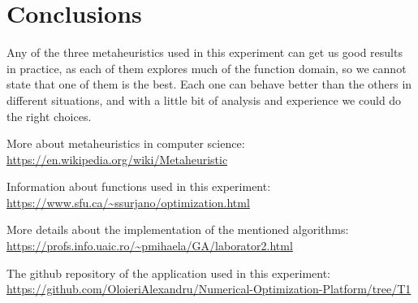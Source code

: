 \documentclass[a4paper]{article}
\begin{document}
\section{Conclusions}

Any of the three metaheuristics used in this experiment can get us good results in practice, as each of them explores much of the function domain, so we cannot state that one of them is the best. Each one can behave better than the others in different situations, and with a little bit of analysis and experience we could do the right choices.

\begin{thebibliography}{9}
	
	More about metaheuristics in computer science:
	\url{https://en.wikipedia.org/wiki/Metaheuristic}
	
	Information about functions used in this experiment:
	\url{https://www.sfu.ca/~ssurjano/optimization.html}
	
	More details about the implementation of the mentioned algorithms:
	\url{https://profs.info.uaic.ro/~pmihaela/GA/laborator2.html}
	
	The github repository of the application used in this experiment:
	\url{https://github.com/OloieriAlexandru/Numerical-Optimization-Platform/tree/T1}
	
\end{thebibliography}
	
\end{document}
